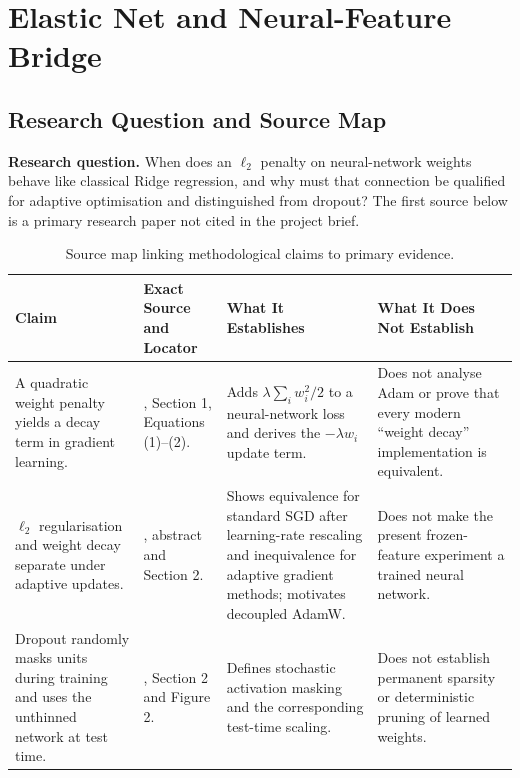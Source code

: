 \section{Elastic Net and Neural-Feature Bridge}
\label{sec:elastic-net}

\subsection{Research Question and Source Map}
\label{sec:research-question}

\textbf{Research question.}  When does an $\ell_2$ penalty on neural-network
weights behave like classical Ridge regression, and why must that connection be
qualified for adaptive optimisation and distinguished from dropout?  The first
source below is a primary research paper not cited in the project brief.

\begin{table}[H]
\centering
\small
\caption{Source map linking methodological claims to primary evidence.}
\label{tab:source-map}
\begin{tabularx}{\textwidth}{>{\raggedright\arraybackslash}X
  >{\raggedright\arraybackslash}p{}
  >{\raggedright\arraybackslash}X
  >{\raggedright\arraybackslash}X}
\toprule
\textbf{Claim} & \textbf{Exact Source and Locator} &
\textbf{What It Establishes} & \textbf{What It Does Not Establish} \\
\midrule
A quadratic weight penalty yields a decay term in gradient learning. &
\citet{Krogh1991}, Section 1, Equations (1)--(2). &
Adds $\lambda\sum_iw_i^2/2$ to a neural-network loss and derives the
$-\lambda w_i$ update term. &
Does not analyse Adam or prove that every modern ``weight decay''
implementation is equivalent. \\[4pt]
$\ell_2$ regularisation and weight decay separate under adaptive updates. &
\citet{LoshchilovHutter2019}, abstract and Section 2. &
Shows equivalence for standard SGD after learning-rate rescaling and
inequivalence for adaptive gradient methods; motivates decoupled AdamW. &
Does not make the present frozen-feature experiment a trained neural network. \\[4pt]
Dropout randomly masks units during training and uses the unthinned network at
test time. &
\citet{Srivastava2014}, Section 2 and Figure 2. &
Defines stochastic activation masking and the corresponding test-time scaling. &
Does not establish permanent sparsity or deterministic pruning of learned
weights. \\
\bottomrule
\end{tabularx}
\end{table}

